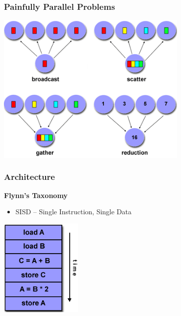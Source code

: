 \documentclass[t]{beamer}
\begin{document}
\begin{frame}
\frametitle{Painfully Parallel Problems}
\begin{center}
  \includegraphics[width=0.7\textwidth]{img/problems.png} 
\end{center}
\end{frame}

\begin{frame}
\frametitle{Architecture}
\textbf{Flynn's Taxonomy}
\begin{itemize}
\item SISD -- Single Instruction, Single Data
\end{itemize}

\begin{center}
\includegraphics[width=0.3\textwidth]{img/sisd.png} 
\end{center}
\end{frame}
\end{document}
